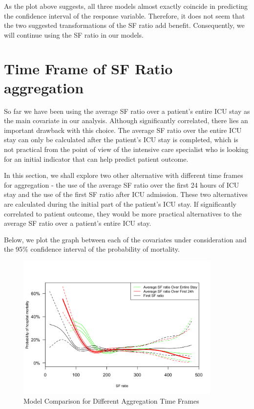 As the plot above suggests, all three models almost exactly coincide in predicting the confidence interval of the response variable. Therefore, it does not seem that the two suggested transformations of the SF ratio add benefit. Consequently, we will continue using the SF ratio in our models. 

\section{Time Frame of SF Ratio aggregation}

So far we have been using the average SF ratio over a patient's entire ICU stay as the main covariate in our analysis. Although significantly correlated, there lies an important drawback with this choice. The average SF ratio over the entire ICU stay can only be calculated after the patient's ICU stay is completed, which is not practical from the point of view of the intensive care specialist who is looking for an initial indicator that can help predict patient outcome. 

In this section, we shall explore two other alternative with different time frames for aggregation - the use of the average SF ratio over the first 24 hours of ICU stay and the use of the first SF ratio after ICU admission. These two alternatives are calculated during the initial part of the patient's ICU stay. If significantly correlated to patient outcome, they would be more practical alternatives to the average SF ratio over a patient's entire ICU stay. 

Below, we plot the graph between each of the covariates under consideration and the 95\% confidence interval of the probability of mortality. 

\begin{figure}[H]
	\centering
	\includegraphics[width=0.9\textwidth]{figures/timeaggregates-4.png}
	\caption{Model Comparison for Different Aggregation Time Frames}
	\label{fig:timeaggregates}
\end{figure}

